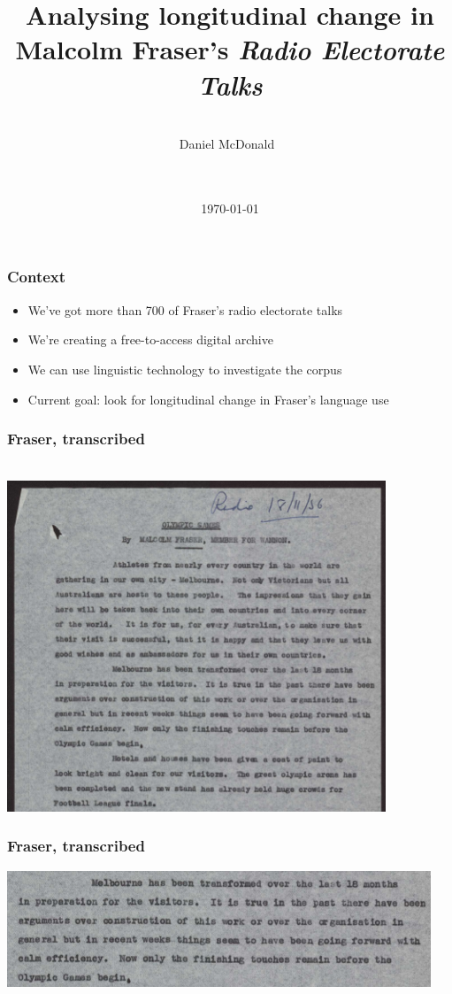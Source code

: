 \documentclass{beamer}       %
\title[\emph{ResPlat}, University of Melbourne]{Analysing longitudinal change in Malcolm Fraser's \emph{Radio Electorate Talks}}
\author[Daniel McDonald]{~\\Daniel McDonald~\\~\\~\\\footnotesize}
\date{\today}
\begin{document}


\frame{\titlepage}

\begin{frame}
	\frametitle{Context}
	\begin{itemize}
	\item We've got more than 700 of Fraser's radio electorate talks
	\item We're creating a free-to-access digital archive
	\item We can use linguistic technology to investigate the corpus
	\item Current goal: look for longitudinal change in Fraser's language use
	\end{itemize}
\end{frame}

\begin{frame}
    \frametitle{Fraser, transcribed}
    \centering ~ \\
    \includegraphics[width=0.85\textwidth]{images/mf-olympics}
\end{frame}

\begin{frame}
    \frametitle{Fraser, transcribed}
    \centering
    \includegraphics[width=0.95\textwidth]{images/mf-melbourne}
\end{frame}
\end{document}
